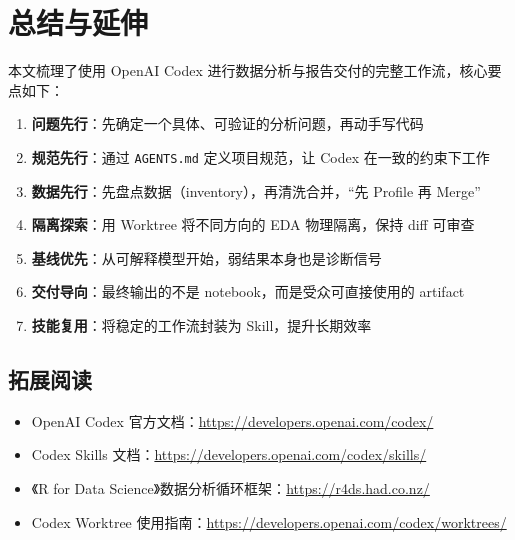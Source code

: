 \section{总结与延伸}

本文梳理了使用 OpenAI Codex 进行数据分析与报告交付的完整工作流，核心要点如下：

\begin{enumerate}
    \item \textbf{问题先行}：先确定一个具体、可验证的分析问题，再动手写代码
    \item \textbf{规范先行}：通过 \texttt{AGENTS.md} 定义项目规范，让 Codex 在一致的约束下工作
    \item \textbf{数据先行}：先盘点数据（inventory），再清洗合并，``先 Profile 再 Merge''
    \item \textbf{隔离探索}：用 Worktree 将不同方向的 EDA 物理隔离，保持 diff 可审查
    \item \textbf{基线优先}：从可解释模型开始，弱结果本身也是诊断信号
    \item \textbf{交付导向}：最终输出的不是 notebook，而是受众可直接使用的 artifact
    \item \textbf{技能复用}：将稳定的工作流封装为 Skill，提升长期效率
\end{enumerate}

\subsection{拓展阅读}

\begin{itemize}
    \item OpenAI Codex 官方文档：\url{https://developers.openai.com/codex/}
    \item Codex Skills 文档：\url{https://developers.openai.com/codex/skills/}
    \item 《R for Data Science》数据分析循环框架：\url{https://r4ds.had.co.nz/}
    \item Codex Worktree 使用指南：\url{https://developers.openai.com/codex/worktrees/}
\end{itemize}



